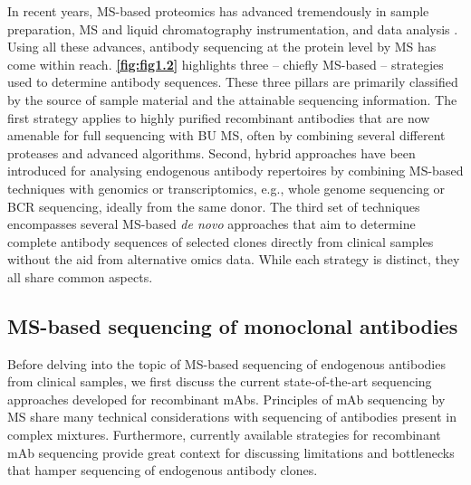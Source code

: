 In recent years, MS-based proteomics has advanced tremendously in sample preparation, MS and liquid chromatography instrumentation, and data analysis \cite{altelaar2013next-generation, aebersold2016mass-spectrometric}. Using all these advances, antibody sequencing at the protein level by MS has come within reach. \textbf{\autoref{fig:fig1.2}} highlights three – chiefly MS-based – strategies used to determine antibody sequences. These three pillars are primarily classified by the source of sample material and the attainable sequencing information. The first strategy applies to highly purified recombinant antibodies that are now amenable for full sequencing with BU MS, often by combining several different proteases and advanced algorithms. Second, hybrid approaches have been introduced for analysing endogenous antibody repertoires by combining MS-based techniques with genomics or transcriptomics, e.g., whole genome sequencing or BCR sequencing, ideally from the same donor. The third set of techniques encompasses several MS-based \emph{de novo} approaches that aim to determine complete antibody sequences of selected clones directly from clinical samples without the aid from alternative omics data. While each strategy is distinct, they all share common aspects.


\subsection{MS-based sequencing of monoclonal antibodies}
Before delving into the topic of MS-based sequencing of endogenous antibodies from clinical samples, we first discuss the current state-of-the-art sequencing approaches developed for recombinant mAbs. Principles of mAb sequencing by MS share many technical considerations with sequencing of antibodies present in complex mixtures. Furthermore, currently available strategies for recombinant mAb sequencing provide great context for discussing limitations and bottlenecks that hamper sequencing of endogenous antibody clones.

